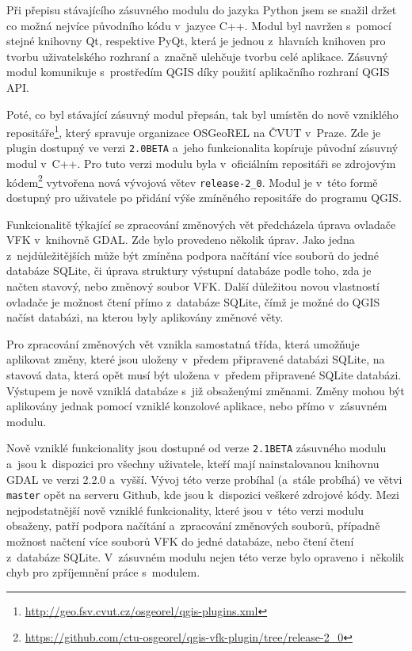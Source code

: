\documentclass[a4paper,12pt,oneside]{book}
\begin{document}
Při přepisu stávajícího zásuvného modulu do jazyka Python jsem se
snažil držet co možná nejvíce původního kódu v~jazyce C++. Modul byl
navržen s~pomocí stejné knihovny Qt, respektive PyQt, která je jednou
z~hlavních knihoven pro tvorbu uživatelského rozhraní a~značně
ulehčuje tvorbu celé aplikace. Zásuvný modul komunikuje s~prostředím
QGIS díky použití aplikačního rozhraní QGIS API.

Poté, co byl stávající zásuvný modul přepsán, tak byl umístěn do nově
vzniklého
repositáře\footnote{\url{http://geo.fsv.cvut.cz/osgeorel/qgis-plugins.xml}},
který spravuje organizace OSGeoREL na ČVUT v~Praze. Zde je plugin
dostupný ve verzi \texttt{2.0BETA} a~jeho funkcionalita kopíruje
původní zásuvný modul v~C++. Pro tuto verzi modulu byla v~oficiálním
repositáři se zdrojovým
kódem\footnote{\url{https://github.com/ctu-osgeorel/qgis-vfk-plugin/tree/release-2_0}}
vytvořena nová vývojová větev \texttt{release-2\_0}. Modul je v~této
formě dostupný pro uživatele po přidání výše zmíněného repositáře do
programu QGIS.

Funkcionalitě týkající se zpracování změnových vět předcházela úprava
ovladače VFK v~knihovně GDAL. Zde bylo provedeno několik úprav. Jako
jedna z~nejdůležitějších může být zmíněna podpora načítání více
souborů do jedné databáze SQLite, či úprava struktury výstupní
databáze podle toho, zda je načten stavový, nebo změnový soubor
VFK. Další důležitou novou vlastností ovladače je možnost čtení přímo
z~databáze SQLite, čímž je možné do QGIS načíst databázi, na kterou
byly aplikovány změnové věty.

Pro zpracování změnových vět vznikla samostatná třída, která umožňuje
aplikovat změny, které jsou uloženy v~předem připravené databázi
SQLite, na stavová data, která opět musí být uložena v~předem
připravené SQLite databázi. Výstupem je nově vzniklá databáze s~již
obsaženými změnami. Změny mohou být aplikovány jednak pomocí vzniklé
konzolové aplikace, nebo přímo v~zásuvném modulu.

Nově vzniklé funkcionality jsou dostupné od verze \texttt{2.1BETA}
zásuvného modulu a~jsou k~dispozici pro všechny uživatele, kteří mají
nainstalovanou knihovnu GDAL ve verzi 2.2.0 a~vyšší. Vývoj této verze
probíhal (a~stále probíhá) ve větvi \texttt{master} opět na serveru
Github, kde jsou k~dispozici veškeré zdrojové kódy. Mezi
nejpodstatnější nově vzniklé funkcionality, které jsou v~této verzi
modulu obsaženy, patří podpora načítání a~zpracování změnových
souborů, případně možnost načtení více souborů VFK do jedné databáze,
nebo čtení čtení z~databáze SQLite. V~zásuvném modulu nejen této verze
bylo opraveno i~několik chyb pro zpříjemnění práce s~modulem.
\end{document}
